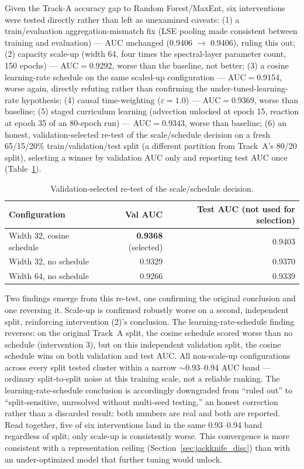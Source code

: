 \documentclass[journal]{IEEEtran}
\begin{document}
Given the Track-A accuracy gap to Random Forest/MaxEnt, six interventions were tested directly rather than left as unexamined caveats: (1) a train/evaluation aggregation-mismatch fix (LSE pooling made consistent between training and evaluation) --- AUC unchanged (0.9406 $\to$ 0.9406), ruling this out; (2) capacity scale-up (width 64, four times the spectral-layer parameter count, 150 epochs) --- AUC$=$0.9292, worse than the baseline, not better; (3) a cosine learning-rate schedule on the same scaled-up configuration --- AUC$=$0.9154, worse again, directly refuting rather than confirming the under-tuned-learning-rate hypothesis; (4) causal time-weighting \cite{wang2022causal} ($\varepsilon=1.0$) --- AUC$=$0.9369, worse than baseline; (5) staged curriculum learning (advection unlocked at epoch 15, reaction at epoch 35 of an 80-epoch run) --- AUC$=$0.9343, worse than baseline; (6) an honest, validation-selected re-test of the scale/schedule decision on a fresh 65/15/20\% train/validation/test split (a different partition from Track~A's 80/20 split), selecting a winner by validation AUC only and reporting test AUC once (Table~\ref{tab:revalid}).

\begin{table}[t]
\centering
\caption{Validation-selected re-test of the scale/schedule decision.}
\label{tab:revalid}
\begin{tabular}{lrr}
\toprule
\textbf{Configuration} & \textbf{Val AUC} & \textbf{Test AUC (not used for selection)} \\
\midrule
Width 32, cosine schedule & \textbf{0.9368} (selected) & 0.9403 \\
Width 32, no schedule & 0.9329 & 0.9370 \\
Width 64, no schedule & 0.9266 & 0.9339 \\
\bottomrule
\end{tabular}
\end{table}

Two findings emerge from this re-test, one confirming the original conclusion and one reversing it. Scale-up is confirmed robustly worse on a second, independent split, reinforcing intervention (2)'s conclusion. The learning-rate-schedule finding reverses: on the original Track~A split, the cosine schedule scored worse than no schedule (intervention 3), but on this independent validation split, the cosine schedule wins on both validation and test AUC. All non-scale-up configurations across every split tested cluster within a narrow $\sim$0.93--0.94 AUC band --- ordinary split-to-split noise at this training scale, not a reliable ranking. The learning-rate-schedule conclusion is accordingly downgraded from ``ruled out'' to ``split-sensitive, unresolved without multi-seed testing,'' an honest correction rather than a discarded result: both numbers are real and both are reported. Read together, five of six interventions land in the same 0.93--0.94 band regardless of split; only scale-up is consistently worse. This convergence is more consistent with a representation ceiling (Section~\ref{sec:jackknife_disc}) than with an under-optimized model that further tuning would unlock.
\end{document}
